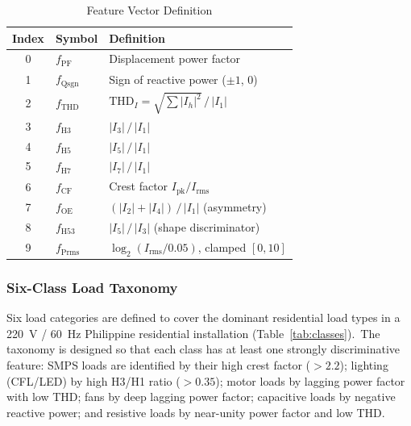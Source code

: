 \documentclass[conference]{IEEEtran}
\begin{document}
\begin{table}[t]
  \caption{Feature Vector Definition}
  \label{tab:features}
  \centering
  \small
  \begin{tabular}{clp{4.0cm}}
    \toprule
    Index & Symbol & Definition \\
    \midrule
    0 & $f_\text{PF}$   & Displacement power factor \\
    1 & $f_\text{Qsgn}$ & Sign of reactive power ($\pm1$, 0) \\
    2 & $f_\text{THD}$  & $\text{THD}_I = \sqrt{\sum |I_h|^2}\,/\,|I_1|$ \\
    3 & $f_\text{H3}$   & $|I_3|\,/\,|I_1|$ \\
    4 & $f_\text{H5}$   & $|I_5|\,/\,|I_1|$ \\
    5 & $f_\text{H7}$   & $|I_7|\,/\,|I_1|$ \\
    6 & $f_\text{CF}$   & Crest factor $I_\text{pk}/I_\text{rms}$ \\
    7 & $f_\text{OE}$   & $(|I_2|+|I_4|)\,/\,|I_1|$ (asymmetry) \\
    8 & $f_\text{H53}$  & $|I_5|\,/\,|I_3|$ (shape discriminator) \\
    9 & $f_\text{Prms}$ & $\log_2(I_\text{rms}/0.05)$, clamped $[0,10]$ \\
    \bottomrule
  \end{tabular}
\end{table}

\subsubsection{Six-Class Load Taxonomy}

Six load categories are defined to cover the dominant residential load
types in a 220~V / 60~Hz Philippine residential installation
(Table~\ref{tab:classes}).\ The taxonomy is designed so that each class
has at least one strongly discriminative feature: SMPS loads are
identified by their high crest factor (\(> 2.2\)); lighting (CFL/LED)
by high H3/H1 ratio (\(> 0.35\)); motor loads by lagging power factor
with low THD; fans by deep lagging power factor; capacitive loads by
negative reactive power; and resistive loads by near-unity power factor
and low THD.
\end{document}
